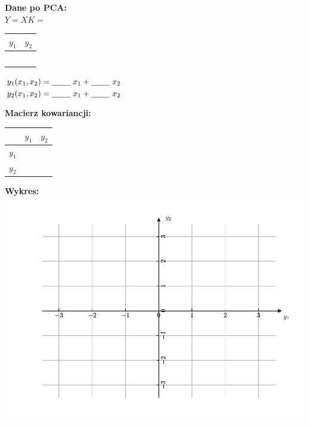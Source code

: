 \documentclass[a4paper,11pt]{article}
\newcommand{\myHeaderCellColor}{\cellcolor{black!10}}
\newcommand{\myEmptySpace}{\hspace{0.8cm}}
\begin{document}
\noindent\begin{minipage}[t]{0.3\textwidth}
	\noindent\textbf{Dane po PCA:}\medskip\\
	$Y = XK =$
	\begin{tabular}{|r|r|}
		\hline
		$y_1$\myHeaderCellColor & $y_2$\myHeaderCellColor\\\hline
		\myEmptySpace&\myEmptySpace\\\hline
		\myEmptySpace&\myEmptySpace\\\hline
		\myEmptySpace&\myEmptySpace\\\hline
		\myEmptySpace&\myEmptySpace\\\hline
		\myEmptySpace&\myEmptySpace\\\hline
	\end{tabular}

	\bigskip
	\bigskip

	$y_1(x_1, x_2) = \underline{\myEmptySpace{}}~x_1 + \underline{\myEmptySpace{}}~x_2$\smallskip\\
	$y_2(x_1, x_2) = \underline{\myEmptySpace{}}~x_1 + \underline{\myEmptySpace{}}~x_2$

\end{minipage}
%
\begin{minipage}[t]{0.3\textwidth}
	\noindent\textbf{Macierz kowariancji:}\medskip\\
	\begin{tabular}{l|r|r|}
		\hhline{|~|-|-|}
		& $y_1$\myHeaderCellColor & $y_2$\myHeaderCellColor\\\hline
		\multicolumn{1}{|l|}{$y_1$\myHeaderCellColor} &\myEmptySpace &\myEmptySpace \\\hline
		\multicolumn{1}{|l|}{$y_2$\myHeaderCellColor} &\myEmptySpace &\myEmptySpace \\\hline
	\end{tabular}
\end{minipage}
%
\begin{minipage}[t]{0.45\textwidth}
	\noindent\textbf{Wykres:}\\\vspace{-0.1cm}
	\hspace{-0.85cm}\includegraphics[width=1.0\textwidth]{img/chart_pca_clear_y.pdf}
\end{minipage}
\end{document}

